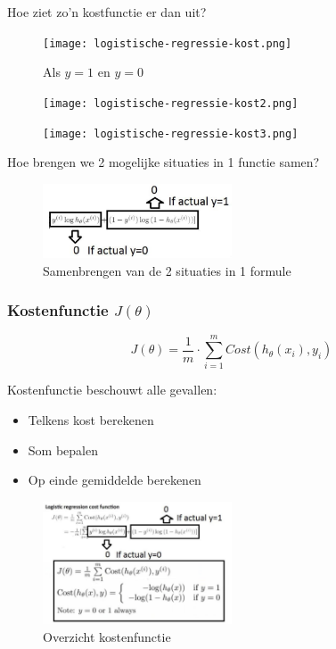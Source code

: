 \documentclass{article}
\begin{document}
Hoe ziet zo'n kostfunctie er dan uit?

\begin{figure}[H]
    \centering
    \texttt{[image: logistische-regressie-kost.png]}
    \caption{Als $y = 1$ en $y = 0$}
\end{figure}

\begin{figure}[H]
    \centering
    \texttt{[image: logistische-regressie-kost2.png]}
\end{figure}

\begin{figure}[H]
    \centering
    \texttt{[image: logistische-regressie-kost3.png]}
\end{figure}

Hoe brengen we 2 mogelijke situaties in 1 functie samen?

\begin{figure}[H]
    \centering
    \includegraphics[width=0.5\textwidth]{logistische-regressie-2situaties.png}
    \caption{Samenbrengen van de 2 situaties in 1 formule}
\end{figure}

\subsubsection{Kostenfunctie $J(\theta)$}

\begin{equation}
    J(\theta) = \frac{1}{m} \cdot \sum_{i=1}^m Cost(h_{\theta}(x_i), y_i)
\end{equation}

Kostenfunctie beschouwt alle gevallen:

\begin{itemize}
    \item Telkens kost berekenen
    \item Som bepalen
    \item Op einde gemiddelde berekenen
\end{itemize}

\begin{figure}[H]
    \centering
    \includegraphics[width=0.5\textwidth]{logistische-regressie-kost-overzicht.png}
    \caption{Overzicht kostenfunctie}
\end{figure}
\end{document}

